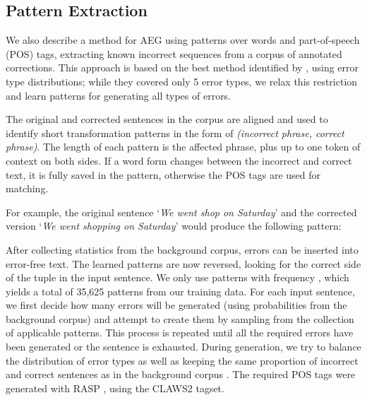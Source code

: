 \documentclass[11pt,letterpaper]{article}
\begin{document}
\subsection{Pattern Extraction}
\label{sec:pat}

We also describe a method for AEG using patterns over words and part-of-speech (POS) tags, extracting known incorrect sequences from a corpus of annotated corrections.
This approach is based on the best method identified by , using error type distributions; while they covered only 5 error types, we relax this restriction and learn patterns for generating all types of errors.


The original and corrected sentences in the corpus are aligned and used to identify short transformation patterns in the form of \textit{(incorrect phrase, correct phrase)}. The length of each pattern is the affected phrase, plus up to one token of context on both sides. If a word form changes between the incorrect and correct text, it is fully saved in the pattern, otherwise the POS tags are used for matching.

For example, the original sentence `\textit{We went shop on Saturday}' and the corrected version `\textit{We went shopping on Saturday}' would produce the following pattern:
\begin{center}
\end{center}


\noindent After collecting statistics from the background corpus, errors can be inserted into error-free text. The learned patterns are now reversed, looking for the correct side of the tuple in the input sentence. 
We only use patterns with frequency , which yields a total of 35,625 patterns from our training data. 
For each input sentence, we first decide how many errors will be generated (using probabilities from the background corpus) and attempt to create them by sampling from the collection of applicable patterns. This process is repeated until all the required errors have been generated or the sentence is exhausted. During generation, we try to balance the distribution of error types as well as keeping the same proportion of incorrect and correct sentences as in the background corpus \cite{UCAM-CL-TR-895}. The required POS tags were generated with RASP \cite{Briscoe2006}, using the CLAWS2 tagset.
\end{document}
